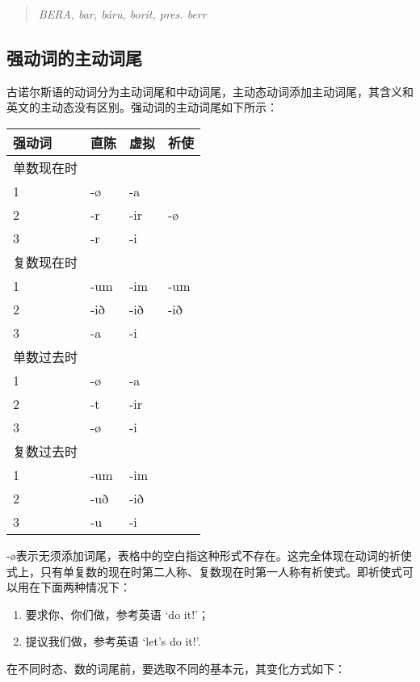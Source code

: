 \begin{quote}
    \textit{BERA, bar, báru, borit, pres. berr}
\end{quote}

\subsection{强动词的主动词尾}\label{强动词的主动词尾}
古诺尔斯语的动词分为主动词尾和中动词尾，主动态动词添加主动词尾，其含义和英文的主动态没有区别。强动词的主动词尾如下所示：
\begin{longtable}{llll}
    \toprule
    强动词   & 直陈  & 虚拟  & 祈使  \\
    \midrule
    \endhead
    \bottomrule
    \endfoot
    单数现在时 &     &     &     \\
    1     & -ø  & -a  &     \\
    2     & -r  & -ir & -ø  \\
    3     & -r  & -i  &     \\
    复数现在时 &     &     &     \\
    1     & -um & -im & -um \\
    2     & -ið & -ið & -ið \\
    3     & -a  & -i  &     \\
    单数过去时 &     &     &     \\
    1     & -ø  & -a  &     \\
    2     & -t  & -ir &     \\
    3     & -ø  & -i  &     \\
    复数过去时 &     &     &     \\
    1     & -um & -im &     \\
    2     & -uð & -ið &     \\
    3     & -u  & -i  &     \\
\end{longtable}

-ø表示无须添加词尾，表格中的空白指这种形式不存在。这完全体现在动词的祈使式上，只有单复数的现在时第二人称、复数现在时第一人称有祈使式。即祈使式可以用在下面两种情况下：

\begin{enumerate}
    \item
          要求你、你们做，参考英语 `do it!'；
    \item
          提议我们做，参考英语 `let's do it!'.
\end{enumerate}

在不同时态、数的词尾前，要选取不同的基本元，其变化方式如下：

